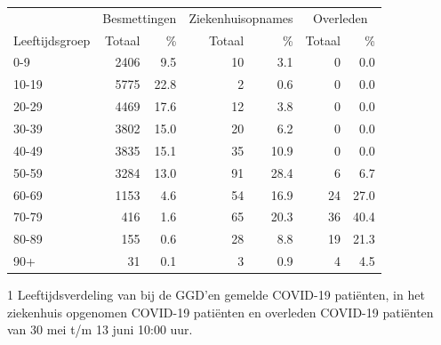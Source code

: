 \documentclass[
  english,
  man,floatsintext]{apa6}
\begin{document}
\begin{table}
\centering\begingroup\fontsize{11}{13}\selectfont

\begin{threeparttable}
\begin{tabular}{lrrrrrr}
\toprule
\multicolumn{1}{c}{ } & \multicolumn{2}{c}{Besmettingen} & \multicolumn{2}{c}{Ziekenhuisopnames} & \multicolumn{2}{c}{Overleden} \\
\cmidrule(l{3pt}r{3pt}){2-3} \cmidrule(l{3pt}r{3pt}){4-5} \cmidrule(l{3pt}r{3pt}){6-7}
Leeftijdsgroep & Totaal & \% & Totaal & \% & Totaal & \%\\
\midrule
0-9 & 2406 & 9.5 & 10 & 3.1 & 0 & 0.0\\
10-19 & 5775 & 22.8 & 2 & 0.6 & 0 & 0.0\\
20-29 & 4469 & 17.6 & 12 & 3.8 & 0 & 0.0\\
30-39 & 3802 & 15.0 & 20 & 6.2 & 0 & 0.0\\
40-49 & 3835 & 15.1 & 35 & 10.9 & 0 & 0.0\\
50-59 & 3284 & 13.0 & 91 & 28.4 & 6 & 6.7\\
60-69 & 1153 & 4.6 & 54 & 16.9 & 24 & 27.0\\
70-79 & 416 & 1.6 & 65 & 20.3 & 36 & 40.4\\
80-89 & 155 & 0.6 & 28 & 8.8 & 19 & 21.3\\
90+ & 31 & 0.1 & 3 & 0.9 & 4 & 4.5\\
\bottomrule
\end{tabular}
\begin{tablenotes}
\item[1] Leeftijdsverdeling van bij de GGD’en gemelde COVID-19 patiënten, in het ziekenhuis opgenomen COVID-19 patiënten en overleden COVID-19 patiënten van 30 mei t/m 13 juni 10:00 uur.
\end{tablenotes}
\end{threeparttable}
\endgroup{}
\end{table}

\newpage
\end{document}
